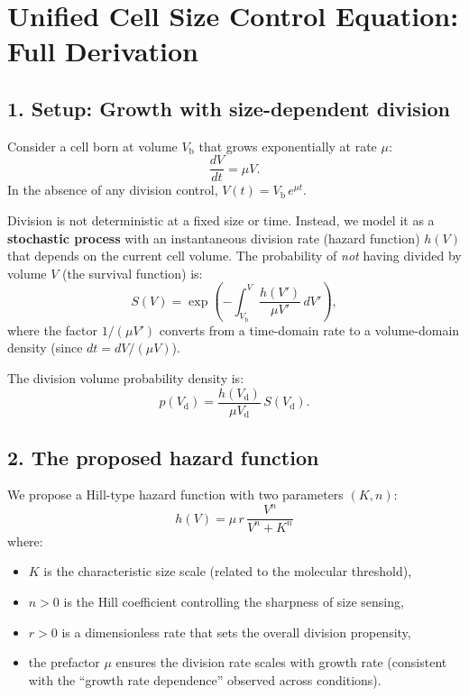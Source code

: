 \documentclass[11pt]{article}
\newcommand{\Vb}{V_{\mathrm{b}}}
\newcommand{\Vd}{V_{\mathrm{d}}}
\begin{document}
\section*{Unified Cell Size Control Equation: Full Derivation}

\subsection*{1. Setup: Growth with size-dependent division}

Consider a cell born at volume $\Vb$ that grows exponentially at rate $\mu$:
\begin{equation}
  \frac{dV}{dt} = \mu V.
  \label{eq:growth}
\end{equation}
In the absence of any division control, $V(t) = \Vb \, e^{\mu t}$.

Division is not deterministic at a fixed size or time. Instead, we model it as a
\textbf{stochastic process} with an instantaneous division rate (hazard function)
$h(V)$ that depends on the current cell volume. The probability of \emph{not} having
divided by volume $V$ (the survival function) is:
\begin{equation}
  S(V) = \exp\!\left(-\int_{\Vb}^{V} \frac{h(V')}{\mu V'}\, dV'\right),
  \label{eq:survival}
\end{equation}
where the factor $1/(\mu V')$ converts from a time-domain rate to a volume-domain
density (since $dt = dV / (\mu V)$).

The division volume probability density is:
\begin{equation}
  p(\Vd) = \frac{h(\Vd)}{\mu \Vd}\, S(\Vd).
  \label{eq:div_pdf}
\end{equation}

\subsection*{2. The proposed hazard function}

We propose a Hill-type hazard function with two parameters $(K, n)$:
\begin{equation}
  \boxed{h(V) = \mu \, r \, \frac{V^n}{V^n + K^n}}
  \label{eq:hazard}
\end{equation}
where:
\begin{itemize}
  \item $K$ is the characteristic size scale (related to the molecular threshold),
  \item $n > 0$ is the Hill coefficient controlling the sharpness of size sensing,
  \item $r > 0$ is a dimensionless rate that sets the overall division propensity,
  \item the prefactor $\mu$ ensures the division rate scales with growth rate
        (consistent with the ``growth rate dependence'' observed across conditions).
\end{itemize}
\end{document}

